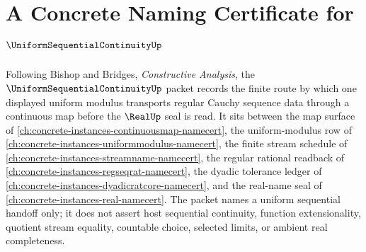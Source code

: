 \chapter{A Concrete Naming Certificate for $\UniformSequentialContinuityUp$}
\label{ch:concrete-instances-uniform-sequential-continuity-namecert}

Following Bishop and Bridges, \emph{Constructive Analysis}, the $\UniformSequentialContinuityUp$ packet records the finite route by which one displayed uniform modulus transports regular Cauchy sequence data through a continuous map before the $\RealUp$ seal is read. It sits between the map surface of \autoref{ch:concrete-instances-continuousmap-namecert}, the uniform-modulus row of \autoref{ch:concrete-instances-uniformmodulus-namecert}, the finite stream schedule of \autoref{ch:concrete-instances-streamname-namecert}, the regular rational readback of \autoref{ch:concrete-instances-regseqrat-namecert}, the dyadic tolerance ledger of \autoref{ch:concrete-instances-dyadicratcore-namecert}, and the real-name seal of \autoref{ch:concrete-instances-real-namecert}. The packet names a uniform sequential handoff only; it does not assert host sequential continuity, function extensionality, quotient stream equality, countable choice, selected limits, or ambient real completeness.


